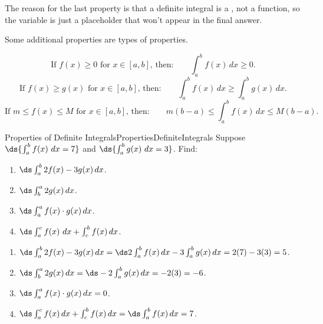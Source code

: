 The reason for the last property is that a definite integral is a , not a function, so the variable is just a placeholder that won't appear in the final answer.

Some additional properties are  types of properties.

\begin{formulabox}
$$\mbox{If $f(x)\geq 0$ for $x\in[a,b]$, then:}\qquad\int_a^b f(x)\,dx\geq 0.$$
$$\mbox{If $f(x)\geq g(x)$ for $x\in[a,b]$, then:}\qquad\int_a^b f(x)\,dx\geq \int_a^b g(x)\,dx.$$
$$\mbox{If $m\leq f(x)\leq M$ for $x\in[a,b]$, then:}\qquad m(b-a)\leq \int_a^b f(x)\,dx\leq M(b-a).$$
\end{formulabox}

\begin{example}{Properties of Definite Integrals}{PropertiesDefiniteIntegrals}
Suppose $\ds{\int_a^b f(x)~dx=7}$ and $\ds{\int_a^b g(x)~dx=3}$. Find:
\begin{multicols}{2}
\begin{enumerate}
	\item	$\ds\int_a^b 2f(x)-3g(x)\,dx$.
	\item	$\ds\int_{b}^{a} 2g(x)\,dx$.
	\item	$\ds\int_a^a f(x)\cdot g(x)\,dx$.
	\item	$\ds\int_a^c f(x)~dx+\int_c^b f(x)\,dx$.
\end{enumerate}
\end{multicols}
\vspace{5mm}
\end{example}
\begin{solution}
\begin{enumerate}
	\item	$\ds\int_a^b 2f(x)-3g(x)\,dx=\ds 2\int_a^b f(x)\,dx-3\int_a^b g(x)\,dx=2(7)-3(3)=5$.
	\item	$\ds\int_{b}^{a} 2g(x)\,dx=\ds -2\int_{a}^{b} g(x)\,dx=-2(3)=-6$.
	\item	$\ds\int_a^a f(x)\cdot g(x)\,dx=0$.
	\item	$\ds\int_a^c f(x)\,dx+\int_c^b f(x)\,dx=\ds\int_a^b f(x)\,dx=7$.
\end{enumerate}
\end{solution}


